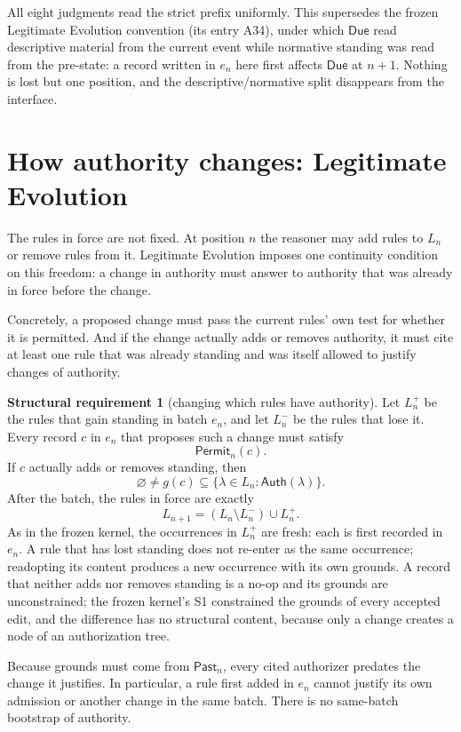 \documentclass[11pt]{article}
\theoremstyle{definition}
\newtheorem{requirement}{Structural requirement}
\theoremstyle{remark}
\newcommand{\Past}{\mathsf{Past}}
\newcommand{\Auth}{\mathsf{Auth}}
\newcommand{\Permit}{\mathsf{Permit}}
\newcommand{\Due}{\mathsf{Due}}
\begin{document}
All eight judgments read the strict prefix uniformly. This supersedes the
frozen Legitimate Evolution convention (its entry A34), under which $\Due$ read
descriptive material from the current event while normative standing was read
from the pre-state: a record written in $e_n$ here first affects $\Due$ at
$n+1$. Nothing is lost but one position, and the descriptive/normative split
disappears from the interface.

\section{How authority changes: Legitimate Evolution}\label{sec:standing}

The rules in force are not fixed. At position $n$ the reasoner may add rules to
$L_n$ or remove rules from it. Legitimate Evolution imposes one continuity
condition on this freedom: a change in authority must answer to authority that
was already in force before the change.

Concretely, a proposed change must pass the current rules' own test for whether
it is permitted. And if the change actually adds or removes authority, it must
cite at least one rule that was already standing and was itself allowed to
justify changes of authority.

\begin{requirement}[changing which rules have authority]\label{req:standing-change}
Let $L_n^+$ be the rules that gain standing in batch $e_n$, and let $L_n^-$ be
the rules that lose it. Every record $c$ in $e_n$ that proposes such a change
must satisfy
\[
 \Permit_n(c).
\]
If $c$ actually adds or removes standing, then
\[
 \varnothing\neq g(c)\subseteq\{\lambda\in L_n:\Auth(\lambda)\}.
\]
After the batch, the rules in force are exactly
\[
 L_{n+1}=(L_n\setminus L_n^-)\cup L_n^+.
\]
As in the frozen kernel, the occurrences in $L_n^+$ are fresh: each is first
recorded in $e_n$. A rule that has lost standing does not re-enter as the same
occurrence; readopting its content produces a new occurrence with its own
grounds. A record that neither adds nor removes standing is a no-op and its
grounds are unconstrained; the frozen kernel's S1 constrained the grounds of
every accepted edit, and the difference has no structural content, because only
a change creates a node of an authorization tree.
\end{requirement}

Because grounds must come from $\Past_n$, every cited authorizer predates the
change it justifies. In particular, a rule first added in $e_n$ cannot justify
its own admission or another change in the same batch. There is no same-batch
bootstrap of authority.
\end{document}
